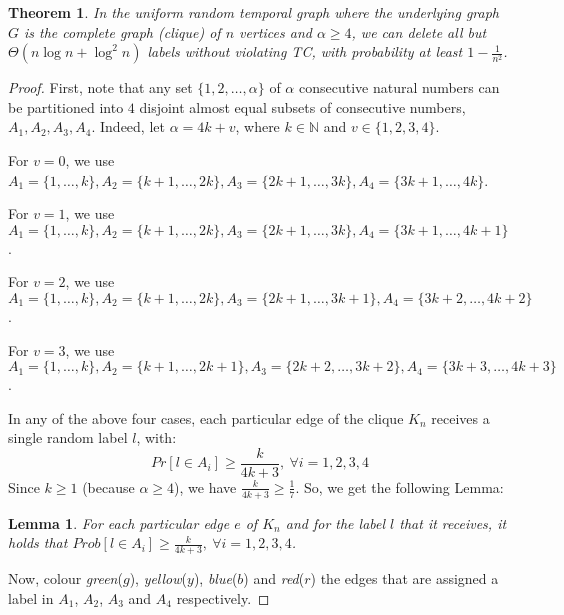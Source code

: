 \documentclass[a4paper,UKenglish]{article}
\newtheorem{theorem}{Theorem}
\newtheorem{lemma}{Lemma}
\begin{document}
\begin{theorem}\label{thm:random_complete}
In the uniform random temporal graph where the underlying graph $G$ is the complete graph (clique) of $n$ vertices and $\alpha \geq 4$, we can delete all but $\Theta(n\log{n} + \log^2{n})$ labels without violating TC, with probability at least $1-\frac{1}{n^2}$.
\end{theorem}
\begin{proof}
First, note that any set $\{1,2, \ldots, \alpha\}$ of $\alpha$ consecutive natural numbers can be partitioned into $4$ disjoint almost equal subsets of consecutive numbers, $A_1,A_2,A_3,A_4$. Indeed, let $\alpha= 4k+v$, where $k\in \mathbb{N}$ and $v \in \{1,2,3,4\}$.

For $v=0$, we use $A_1=\{1,\ldots,k\}, A_2=\{k+1, \ldots, 2k\}, A_3=\{2k+1, \ldots, 3k\}, A_4= \{3k+1, \ldots, 4k\}$.

For $v=1$, we use $A_1=\{1,\ldots,k\}, A_2=\{k+1, \ldots, 2k\}, A_3=\{2k+1, \ldots, 3k\}, A_4= \{3k+1, \ldots, 4k+1\}$.

For $v=2$, we use $A_1=\{1,\ldots,k\}, A_2=\{k+1, \ldots, 2k\}, A_3=\{2k+1, \ldots, 3k+1\}, A_4= \{3k+2, \ldots, 4k+2\}$.

For $v=3$, we use $A_1=\{1,\ldots,k\}, A_2=\{k+1, \ldots, 2k+1\}, A_3=\{2k+2, \ldots, 3k+2\}, A_4= \{3k+3, \ldots, 4k+3\}$.

In any of the above four cases, each particular edge of the clique $K_n$ receives a single random label $l$, with:
\[Pr[l \in A_i] \geq \frac{k}{4k+3},~ \forall i=1,2,3,4\]
Since $k\geq 1$ (because $\alpha\geq 4$), we have $\frac{k}{4k+3} \geq \frac{1}{7}$. So, we get the following Lemma:
\begin{lemma}\label{lem:clique_set_partition}
For each particular edge $e$ of $K_n$ and for the label $l$ that it receives, it holds that $Prob[l \in A_i] \geq \frac{k}{4k+3},~ \forall i=1,2,3,4$.
\end{lemma}
Now, colour \emph{green}($g$), \emph{yellow}($y$), \emph{blue}($b$) and \emph{red}($r$) the edges that are assigned a label in $A_1$, $A_2$, $A_3$ and $A_4$ respectively.


\end{proof}
\end{document}
